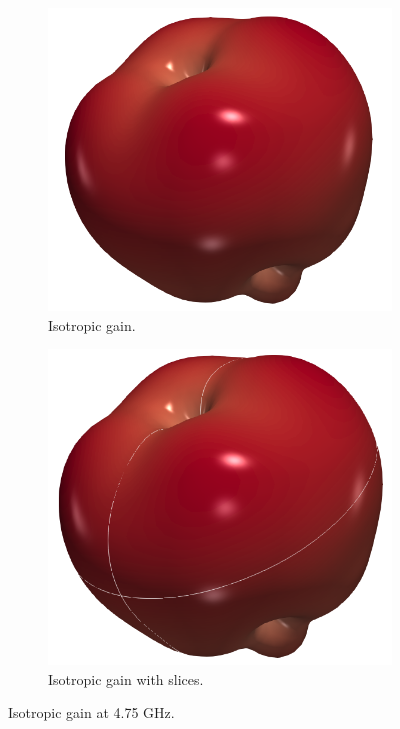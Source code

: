 \documentclass[titlepage]{article}
\renewcommand\_{\textunderscore\linebreak[1]}
\begin{document}
\begin{itemize}
\begin{figure}[H]
  \centering
  \begin{subfigure}{0.33\textwidth}
     \includegraphics[width=\linewidth]{../tutorials/OpenParEM3D/monopole_antenna/screenshots/monopole_3D_gain}
     \caption{Isotropic gain.}
  \end{subfigure}
  \begin{subfigure}{0.33\textwidth}
     \includegraphics[width=\linewidth]{../tutorials/OpenParEM3D/monopole_antenna/screenshots/monopole_3D_gain_slices}
     \caption{Isotropic gain with slices.}
  \end{subfigure}
  \caption{Isotropic gain at 4.75 GHz.}
  \label{fig:monopole_G}
\end{figure}


\end{itemize}
\end{document}
